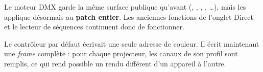 Le moteur DMX garde la même surface publique qu'avant (,
,  , , \dots), mais
les applique désormais au \textbf{patch entier}. Les anciennes fonctions de
l'onglet Direct et le lecteur de séquences continuent donc de fonctionner.

\begin{note}
Le contrôleur par défaut écrivait une seule adresse de couleur. Il écrit
maintenant une \emph{frame} complète : pour chaque projecteur, les canaux de son
profil sont remplis, ce qui rend possible un rendu différent d'un appareil à
l'autre.
\end{note}
